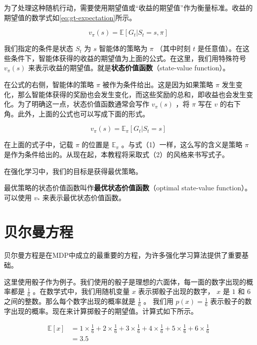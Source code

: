 \documentclass[lang=cn,newtx,10pt,scheme=chinese]{elegantbook}
\begin{document}
为了处理这种随机行动，需要使用期望值或``收益的期望值''作为衡量标准。收益的期望值的数学式如\ref{eq:gt-expectation}所示。

\begin{equation}\label{eq:gt-expectation}
v_\pi(s) = \mathbb{E}[G_t|S_t=s,\pi]
\end{equation}

我们指定的条件是状态 $S_t$ 为 $s$ 智能体的策略为 $\pi$ （其中时刻 $t$ 是任意值）。在这些条件下，智能体获得的收益的期望值为上面的公式。在这里，我们用特殊符号 $v_\pi(s)$ 来表示收益的期望值。就是\textbf{状态价值函数}（state-value function）。

在公式的右侧，智能体的策略 $\pi$ 被作为条件给出。这是因为如果策略 $\pi$ 发生变化，那么智能体获得的奖励也会发生变化，而这些奖励的总和，即收益也会发生变化。为了明确这一点，状态价值函数通常会写作 $v_\pi(s)$ ，将 $\pi$ 写在 $v$ 的右下角。此外，上面的公式也可以写成下面的形式。

\begin{equation}
v_\pi(s) = \mathbb{E}_\pi[G_t|S_t=s]
\end{equation}

在上面的式子中，记载 $\pi$ 的位置是 $\mathbb{E}_\pi$ 。与式（1）一样，这么写的含义是策略 $\pi$ 是作为条件给出的。从现在起，本教程将采取式（2）的风格来书写式子。

在强化学习中，我们的目标是获得最优策略。

最优策略的状态价值函数叫作\textbf{最优状态价值函数}（optimal state-value function）。可以使用 $v_*$ 来表示最优状态价值函数。

\section{贝尔曼方程}

贝尔曼方程是在MDP中成立的最重要的方程，为许多强化学习算法提供了重要基础。

这里使用骰子作为例子。我们使用的骰子是理想的六面体，每一面的数字出现的概率都是 $\frac{1}{6}$ 。在数学式中，我们用随机变量 $x$ 表示掷骰子出现的数字， $x$ 是 $1$ 和 $6$ 之间的整数。那么每个数字出现的概率就是 $\frac{1}{6}$ 。 我们用 $p(x)=\frac{1}{6}$ 表示骰子的数字出现的概率。现在来计算掷骰子的期望值。计算式如下所示。

\begin{equation}
\begin{aligned}
\mathbb{E}[x] &= 1\times\frac{1}{6}+2\times\frac{1}{6}+3\times\frac{1}{6}+4\times\frac{1}{6}+5\times\frac{1}{6}+6\times\frac{1}{6} \\
&= 3.5
\end{aligned}
\end{equation}
\end{document}
